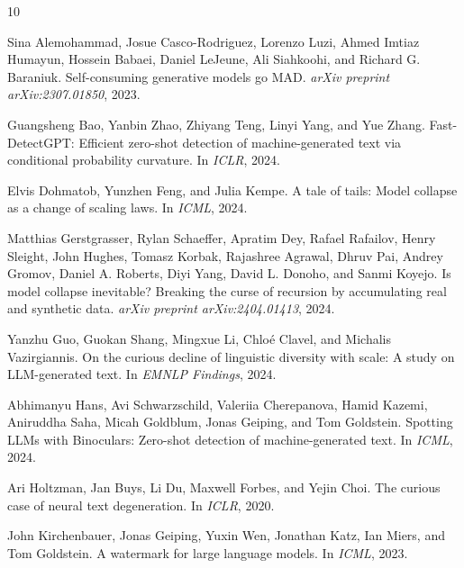 \documentclass[letterpaper]{article}
\begin{document}

\begin{thebibliography}{10}

Sina Alemohammad, Josue Casco-Rodriguez, Lorenzo Luzi, Ahmed Imtiaz Humayun, Hossein Babaei, Daniel LeJeune, Ali Siahkoohi, and Richard G. Baraniuk.
\newblock Self-consuming generative models go MAD.
\newblock \emph{arXiv preprint arXiv:2307.01850}, 2023.

Guangsheng Bao, Yanbin Zhao, Zhiyang Teng, Linyi Yang, and Yue Zhang.
\newblock Fast-DetectGPT: Efficient zero-shot detection of machine-generated text via conditional probability curvature.
\newblock In \emph{ICLR}, 2024.

Elvis Dohmatob, Yunzhen Feng, and Julia Kempe.
\newblock A tale of tails: Model collapse as a change of scaling laws.
\newblock In \emph{ICML}, 2024.

Matthias Gerstgrasser, Rylan Schaeffer, Apratim Dey, Rafael Rafailov, Henry Sleight, John Hughes, Tomasz Korbak, Rajashree Agrawal, Dhruv Pai, Andrey Gromov, Daniel A. Roberts, Diyi Yang, David L. Donoho, and Sanmi Koyejo.
\newblock Is model collapse inevitable? Breaking the curse of recursion by accumulating real and synthetic data.
\newblock \emph{arXiv preprint arXiv:2404.01413}, 2024.

Yanzhu Guo, Guokan Shang, Mingxue Li, Chlo{\'e} Clavel, and Michalis Vazirgiannis.
\newblock On the curious decline of linguistic diversity with scale: A study on LLM-generated text.
\newblock In \emph{EMNLP Findings}, 2024.

Abhimanyu Hans, Avi Schwarzschild, Valeriia Cherepanova, Hamid Kazemi, Aniruddha Saha, Micah Goldblum, Jonas Geiping, and Tom Goldstein.
\newblock Spotting LLMs with Binoculars: Zero-shot detection of machine-generated text.
\newblock In \emph{ICML}, 2024.

Ari Holtzman, Jan Buys, Li Du, Maxwell Forbes, and Yejin Choi.
\newblock The curious case of neural text degeneration.
\newblock In \emph{ICLR}, 2020.

John Kirchenbauer, Jonas Geiping, Yuxin Wen, Jonathan Katz, Ian Miers, and Tom Goldstein.
\newblock A watermark for large language models.
\newblock In \emph{ICML}, 2023.


\end{thebibliography}
\end{document}
